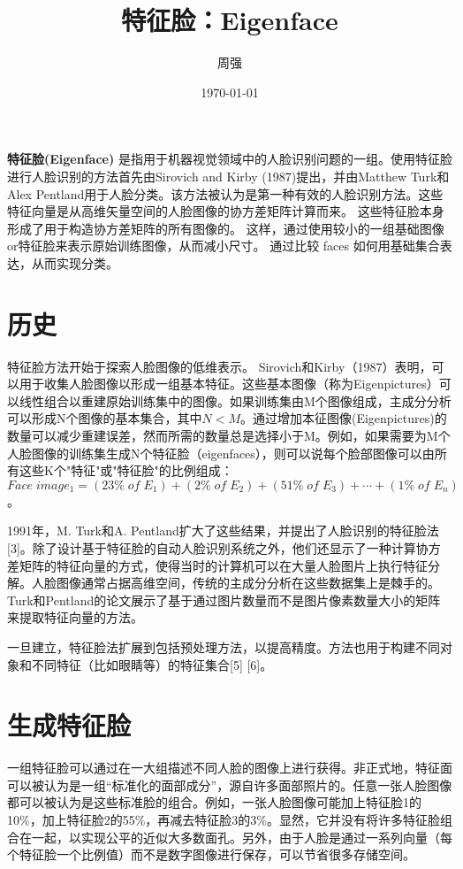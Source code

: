\documentclass[UTF8]{ctexart}
\title{特征脸：Eigenface}
\author{周强}
\date{\today}
\begin{document}
\maketitle %

{\bf{特征脸(Eigenface)}} 是指用于机器视觉领域中的人脸识别问题的一组{\color{blue}{特征向量}}。使用特征脸进行人脸识别的方法首先由Sirovich and Kirby (1987)\cite{Sirovich1987}提出，并由Matthew Turk和Alex Pentland\cite{Turk1991}用于人脸分类。该方法被认为是第一种有效的人脸识别方法。这些特征向量是从高维矢量空间的人脸图像的协方差矩阵计算而来。 这些特征脸本身形成了用于构造协方差矩阵的所有图像的{\color{blue}{基础集合（basis set）}}。 这样，通过使用较小的一组基础图像or特征脸来表示原始训练图像，从而减小尺寸。 通过比较 faces 如何用基础集合表达，从而实现分类。

\section{历史}
特征脸方法开始于探索人脸图像的低维表示。 Sirovich和Kirby（1987）表明，{\color{blue}{主成分分析}}可以用于收集人脸图像以形成一组基本特征。这些基本图像（称为Eigenpictures）可以线性组合以重建原始训练集中的图像。如果训练集由M个图像组成，主成分分析可以形成N个图像的基本集合，其中$N<M$。通过增加本征图像(Eigenpictures)的数量可以减少重建误差，然而所需的数量总是选择小于M。例如，如果需要为M个人脸图像的训练集生成N个特征脸（eigenfaces），则可以说每个脸部图像可以由所有这些K个"特征"或"特征脸"的比例组成：$Face \; image_1 = (23\% \; of\;  E_1) + (2\% \; of\;  E_2) + (51\% \; of\;  E_3) + \cdots + (1\% \; of\;  E_n)$。

1991年，M. Turk和A. Pentland扩大了这些结果，并提出了人脸识别的特征脸法[3]。除了设计基于特征脸的自动人脸识别系统之外，他们还显示了一种计算协方差矩阵的特征向量的方式，使得当时的计算机可以在大量人脸图片上执行特征分解。人脸图像通常占据高维空间，传统的主成分分析在这些数据集上是棘手的。 Turk和Pentland的论文展示了基于通过图片数量而不是图片像素数量大小的矩阵来提取特征向量的方法。

一旦建立，特征脸法扩展到包括预处理方法，以提高精度。{\color{blue}{多重流形(multiple manifold)}}方法也用于构建不同对象和不同特征（比如眼睛等）的特征集合[5] [6]。

\section{生成特征脸}
一组特征脸可以通过在一大组描述不同人脸的图像上进行{\color{blue}{主成分分析（PCA）}}获得。非正式地，特征面可以被认为是一组“标准化的面部成分”，源自许多面部照片的{\color{blue}{统计分析}}。任意一张人脸图像都可以被认为是这些标准脸的组合。例如，一张人脸图像可能{\color{blue}{平均脸（average face）}}加上特征脸1的10\%，加上特征脸2的55\%，再减去特征脸3的3\%。显然，它并没有将许多特征脸组合在一起，以实现公平的近似大多数面孔。另外，由于人脸是通过一系列向量（每个特征脸一个比例值）而不是数字图像进行保存，可以节省很多存储空间。
\end{document}
